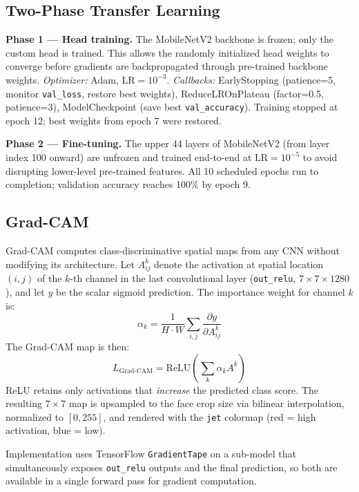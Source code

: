 \documentclass[11pt,a4paper]{article}
\begin{document}
\subsection{Two-Phase Transfer Learning}

\textbf{Phase 1 — Head training.}
The MobileNetV2 backbone is frozen; only the custom head is trained.
This allows the randomly initialized head weights to converge before gradients
are backpropagated through pre-trained backbone weights.
\textit{Optimizer:} Adam, $\text{LR} = 10^{-3}$.
\textit{Callbacks:} EarlyStopping (patience=5, monitor \texttt{val\_loss},
restore best weights), ReduceLROnPlateau (factor=0.5, patience=3),
ModelCheckpoint (save best \texttt{val\_accuracy}).
Training stopped at epoch 12; best weights from epoch 7 were restored.

\textbf{Phase 2 — Fine-tuning.}
The upper 44 layers of MobileNetV2 (from layer index 100 onward) are unfrozen
and trained end-to-end at $\text{LR} = 10^{-5}$ to avoid disrupting lower-level
pre-trained features.
All 10 scheduled epochs run to completion; validation accuracy reaches 100\% by
epoch 9.

\subsection{Grad-CAM}

Grad-CAM \cite{selvaraju2017} computes class-discriminative spatial maps from
any CNN without modifying its architecture.
Let $A^k_{ij}$ denote the activation at spatial location $(i,j)$ of the $k$-th
channel in the last convolutional layer (\texttt{out\_relu}, $7{\times}7{\times}1280$),
and let $y$ be the scalar sigmoid prediction.
The importance weight for channel $k$ is:
\begin{equation}
    \alpha_k = \frac{1}{H \cdot W} \sum_{i,j}
               \frac{\partial y}{\partial A^k_{ij}}
    \label{eq:alpha}
\end{equation}
The Grad-CAM map is then:
\begin{equation}
    L_{\text{Grad-CAM}} = \text{ReLU}\!\left(\sum_k \alpha_k A^k\right)
    \label{eq:gcam}
\end{equation}
ReLU retains only activations that \textit{increase} the predicted class score.
The resulting $7{\times}7$ map is upsampled to the face crop size via bilinear
interpolation, normalized to $[0, 255]$, and rendered with the \texttt{jet}
colormap (red = high activation, blue = low).

Implementation uses TensorFlow \texttt{GradientTape} on a sub-model that
simultaneously exposes \texttt{out\_relu} outputs and the final prediction,
so both are available in a single forward pass for gradient computation.
\end{document}
